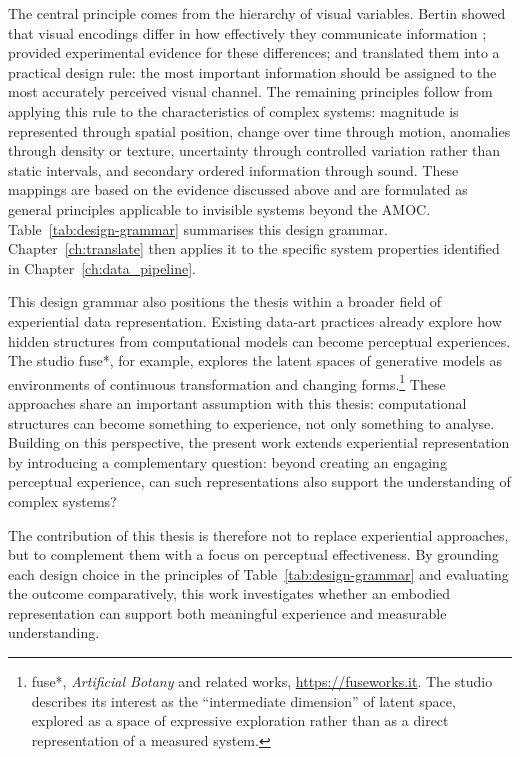 The central principle comes from the hierarchy of visual variables. Bertin showed that visual encodings differ in how effectively they communicate information \citep{bertin1983}; \citet{clevelandmcgill1984} provided experimental evidence for these differences; and \citet{munzner2014} translated them into a practical design rule: the most important information should be assigned to the most accurately perceived visual channel. The remaining principles follow from applying this rule to the characteristics of complex systems: magnitude is represented through spatial position, change over time through motion, anomalies through density or texture, uncertainty through controlled variation rather than static intervals, and secondary ordered information through sound. These mappings are based on the evidence discussed above and are formulated as general principles applicable to invisible systems beyond the AMOC. Table~\ref{tab:design-grammar} summarises this design grammar. Chapter~\ref{ch:translate} then applies it to the specific system properties identified in Chapter~\ref{ch:data_pipeline}.

This design grammar also positions the thesis within a broader field of experiential data representation. Existing data-art practices already explore how hidden structures from computational models can become perceptual experiences. The studio fuse*, for example, explores the latent spaces of generative models as environments of continuous transformation and changing forms.\footnote{fuse*, \emph{Artificial Botany} and related works, \url{https://fuseworks.it}. The studio describes its interest as the ``intermediate dimension'' of latent space, explored as a space of expressive exploration rather than as a direct representation of a measured system.} These approaches share an important assumption with this thesis: computational structures can become something to experience, not only something to analyse. Building on this perspective, the present work extends experiential representation by introducing a complementary question: beyond creating an engaging perceptual experience, can such representations also support the understanding of complex systems? 



The contribution of this thesis is therefore not to replace experiential approaches, but to complement them with a focus on perceptual effectiveness. By grounding each design choice in the principles of Table~\ref{tab:design-grammar} and evaluating the outcome comparatively, this work investigates whether an embodied representation can support both meaningful experience and measurable understanding.

